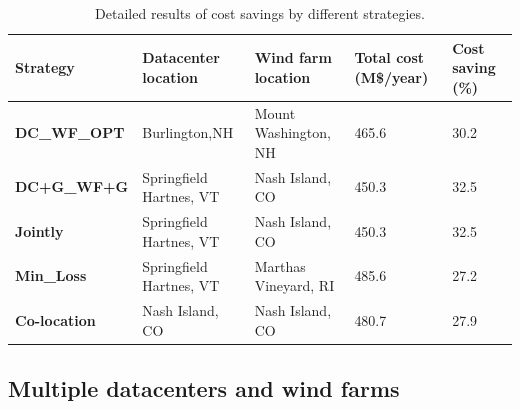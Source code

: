 \begin{table}[ht]
\begin{center}
\caption{Detailed results of cost savings by different strategies.}
\begin{tabular}{|l|p{50pt}|p{50pt}|p{30pt}|p{20pt}|}
\hline
\textbf{Strategy}& \textbf{Datacenter location} &\textbf{Wind farm location} &\textbf{Total cost (M\$/year)} &\textbf{Cost saving (\%)} \\
\hline
\textbf{DC\_WF\_OPT} &  Burlington,NH  & Mount Washington, NH &465.6& 30.2 \\
\textbf{DC+G\_WF+G} &Springfield Hartnes, VT  & Nash Island, CO&450.3& 32.5\\
\textbf{Jointly} &Springfield Hartnes, VT&  Nash Island, CO & 450.3 & 32.5\\
\textbf{Min\_Loss} &Springfield Hartnes, VT & Marthas Vineyard, RI & 485.6& 27.2 \\
\textbf{Co-location}& Nash Island, CO &Nash Island, CO&480.7 & 27.9  \\
\hline
\end{tabular}
\label{tab:costsaving}
\end{center}
\end{table}

\subsection{Multiple datacenters and wind farms}


